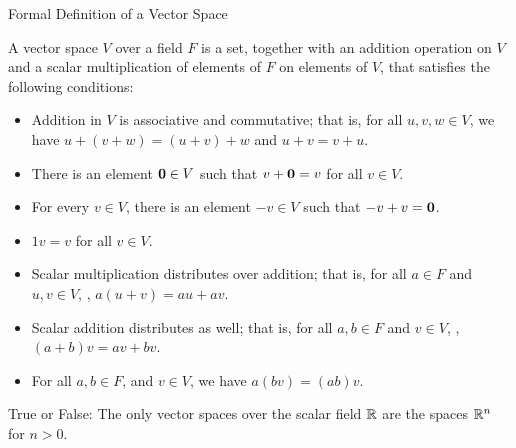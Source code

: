 \begin{edXshowhide}{Formal Definition of a Vector Space}


A vector space $V$ over a field $F$ is a set, together with an addition operation on $V$
and a scalar multiplication of elements of $F$ on elements of $V$, that satisfies
the following conditions:

\begin{itemize}
\item Addition in $V$ is associative and commutative; that is, for all $u,v,w \in V$, we have
$u+(v+w) = (u+v)+w$ and $u+v  = v+u$.  
\item There is an element $\mathbf{0} \in V$ such that $v+\mathbf{0} = v$ for all $v \in V$.
\item For every $v\in V$, there is an element $-v \in V$ such that $-v + v = \mathbf{0}$.  
\item $1v = v$ for all $v \in V$.  
\item Scalar multiplication distributes over addition; that is, for all $a \in F$ and $u,v \in V$, , $a(u+v) = au + av$.  
\item Scalar addition distributes as well; that is, for all $a,b \in F$ and $v \in V$, , $(a+b)v = av + bv$.  
\item For all $a,b \in F$, and $v\in V$, we have $a(bv) = (ab)v$.  
\end{itemize}

\end{edXshowhide}




\endedxtext



True or False: The only vector spaces over the scalar field $\mathbb R$ are the spaces
$\mathbb R^n$ for $n> 0$.  


\edXsolution{  }

\endedxproblem


\endedxvertical

